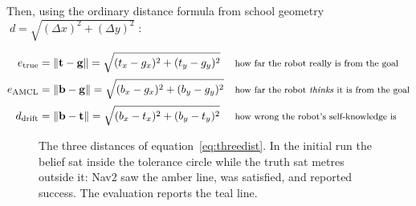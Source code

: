 \documentclass[11pt,a4paper]{report}
\begin{document}
Then, using the ordinary distance formula from school geometry
$\;d = \sqrt{(\Delta x)^2 + (\Delta y)^2}\;$:

\begin{equation}
\begin{aligned}
e_{\text{true}} &= \lVert \mathbf{t} - \mathbf{g} \rVert
  = \sqrt{(t_x - g_x)^2 + (t_y - g_y)^2}
  && \text{\footnotesize how far the robot really is from the goal} \\[2pt]
e_{\text{AMCL}} &= \lVert \mathbf{b} - \mathbf{g} \rVert
  = \sqrt{(b_x - g_x)^2 + (b_y - g_y)^2}
  && \text{\footnotesize how far the robot \emph{thinks} it is from the goal} \\[2pt]
d_{\text{drift}} &= \lVert \mathbf{b} - \mathbf{t} \rVert
  = \sqrt{(b_x - t_x)^2 + (b_y - t_y)^2}
  && \text{\footnotesize how wrong the robot's self-knowledge is}
\end{aligned}
\label{eq:threedist}
\end{equation}

\begin{figure}[htbp]
\centering
{}
\caption[The evaluation triangle]{The three distances of
equation~\eqref{eq:threedist}. In the initial run the belief sat inside the
tolerance circle while the truth sat metres outside it: Nav2 saw the amber
line, was satisfied, and reported success. The evaluation reports the teal
line.}
\label{fig:triangle}
\end{figure}
\end{document}

